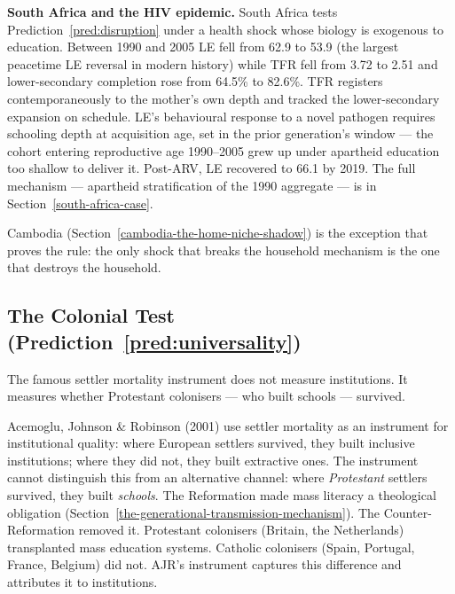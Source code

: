 \documentclass[12pt,letterpaper]{article}
\begin{document}
\textbf{South Africa and the HIV epidemic.} South Africa tests
Prediction~\ref{pred:disruption} under a health shock whose biology
is exogenous to education. Between 1990 and 2005 LE fell from 62.9
to 53.9 (the largest peacetime LE reversal in modern history) while
TFR fell from 3.72 to 2.51 and lower-secondary completion rose from
64.5\% to 82.6\%. TFR registers contemporaneously to the mother's
own depth and tracked the lower-secondary expansion on schedule.
LE's behavioural response to a novel pathogen requires schooling
depth at acquisition age, set in the prior generation's window ---
the cohort entering reproductive age 1990--2005 grew up under
apartheid education too shallow to deliver it. Post-ARV, LE recovered
to 66.1 by 2019. The full mechanism --- apartheid stratification of the
1990 aggregate --- is in Section~\ref{south-africa-case}.

Cambodia (Section~\ref{cambodia-the-home-niche-shadow}) is the exception that
proves the rule: the only shock that breaks the household mechanism is
the one that destroys the household.

\subsection{The Colonial Test (Prediction~\ref{pred:universality})}\label{the-colonial-test}

The famous settler mortality instrument does not measure institutions. It measures whether Protestant colonisers --- who built schools --- survived.

Acemoglu, Johnson \& Robinson (2001) use settler mortality as an
instrument for institutional quality: where European settlers survived,
they built inclusive institutions; where they did not, they built
extractive ones. The instrument cannot distinguish this from an
alternative channel: where \emph{Protestant} settlers survived, they
built \emph{schools}. The Reformation made mass literacy a theological
obligation (Section~\ref{the-generational-transmission-mechanism}). The Counter-Reformation removed it. Protestant
colonisers (Britain, the Netherlands) transplanted mass education
systems. Catholic colonisers (Spain, Portugal, France, Belgium) did not.
AJR's instrument captures this difference and attributes it to
institutions.
\end{document}
